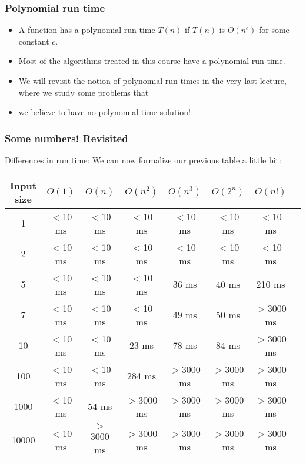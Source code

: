 \begin{frame}
	\frametitle{Polynomial run time}
	
		\begin{itemize}
			\item A function has a polynomial run time $T(n)$ if $T(n)$ is $O(n^c)$ for some constant $c$.	
			\item Most of the algorithms treated in this course have a polynomial run time.
			\item We will revisit the notion of polynomial run times in the very last lecture, where we study some problems that
			\item we believe to have no polynomial time solution!
	\end{itemize}	
\end{frame}

\begin{frame}
	\frametitle{Some numbers! Revisited}
	
Differences in run time:		We can now formalize our previous table a little bit:
		

		\begin{tabular}{c | c c c c c c c}
			\scriptsize
			Input size & \alert{$O(1)$} & \alert{$O(n)$} & \alert{$O(n^2)$} & \alert{$O(n^3)$} & \alert{$O(2^n)$} & \alert{$O(n!)$} \\
			\midrule
			1 & $<$10 ms & $<$10 ms & $<$10 ms & $<$10 ms & $<$10 ms & $<$10 ms\\
			2 & $<$10 ms & $<$10 ms & $<$10 ms & $<$10 ms & $<$10 ms & $<$10 ms\\
			5 & $<$10 ms & $<$10 ms & $<$10 ms & 36 ms & 40 ms & 210 ms\\
			7 & $<$10 ms & $<$10 ms & $<$10 ms & 49 ms & 50 ms & $>$3000 ms \\
			10 & $<$10 ms & $<$10 ms & 23 ms & 78 ms & 84 ms & $>$3000 ms\\
			100 & $<$10 ms & $<$10 ms & 284 ms & $>$3000 ms & $>$3000 ms & $>$3000 ms \\
			1000 & $<$10 ms & 54 ms & $>$3000 ms &$>$3000 ms & $>$3000 ms & $>$3000 ms \\
			10000 & $<$10 ms &  $>$3000 ms &$>$3000 ms &$>$3000 ms & $>$3000 ms & $>$3000 ms \\
		\end{tabular}
\end{frame}

